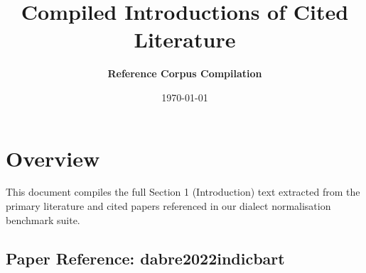 \documentclass[11pt,a4paper]{article}
\title{\textbf{Compiled Introductions of Cited Literature}}
\author{\textbf{Reference Corpus Compilation}}
\date{\today}
\begin{document}
\maketitle

\section*{Overview}
This document compiles the full Section 1 (Introduction) text extracted from the primary literature and cited papers referenced in our dialect normalisation benchmark suite.

\hr



\subsection*{Paper Reference: dabre2022indicbart}
\end{document}
